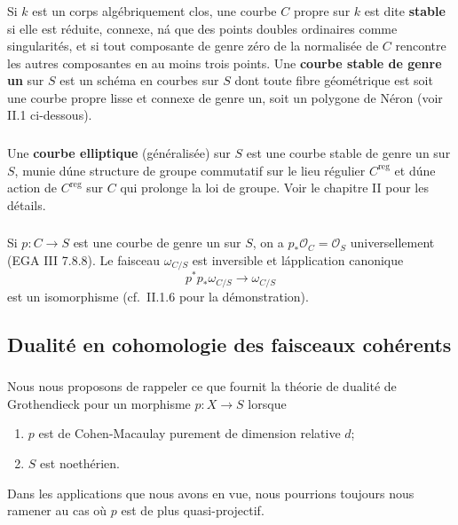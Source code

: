 \documentclass{amsart}
\theoremstyle{plain}
\theoremstyle{remark}
\newcommand{\cO}{\mathcal{O}}
\begin{document}
\subsubsection{}
Si $k$ est un corps alg\'ebriquement clos, une courbe $C$ propre sur $k$ est dite
\textbf{stable} si elle est r\'eduite, connexe, n\'a que des points doubles ordinaires comme
singularit\'es, et si tout composante de genre z\'ero de la normalis\'ee de $C$ rencontre les
autres composantes en au moins trois points. Une \textbf{courbe stable de genre un} sur $S$
est un sch\'ema en courbes sur $S$ dont toute fibre g\'eom\'etrique est soit une courbe propre
lisse et connexe de genre un, soit un polygone de N\'eron (voir II.1 ci-dessous).

\subsubsection{}
Une \textbf{courbe elliptique} (g\'en\'eralis\'ee) sur $S$ est une courbe stable de genre un sur $S$,
munie d\'une structure de groupe commutatif sur le lieu r\'egulier $C^{\mathrm{reg}}$ et d\'une action
de $C^{\mathrm{reg}}$ sur $C$ qui prolonge la loi de groupe. Voir le chapitre II pour les d\'etails.

\subsubsection{}
Si $p: C \to S$ est une courbe de genre un sur $S$, on a $p_* \cO_C = \cO_S$
universellement (EGA III 7.8.8). Le faisceau $\omega_{C/S}$ est inversible et l\'application
canonique
\[
p^* p_* \omega_{C/S} \to \omega_{C/S}
\]
est un isomorphisme (cf.~II.1.6 pour la d\'emonstration).

\subsection{Dualit\'e en cohomologie des faisceaux coh\'erents}

\subsubsection{}
Nous nous proposons de rappeler ce que fournit la th\'eorie de dualit\'e de Grothendieck
pour un morphisme $p: X \to S$ lorsque
\begin{enumerate}
\item[(a)] $p$ est de Cohen-Macaulay purement de dimension relative $d$;
\item[(b)] $S$ est noeth\'erien.
\end{enumerate}
Dans les applications que nous avons en vue, nous pourrions toujours nous ramener au cas
o\`u $p$ est de plus quasi-projectif.
\end{document}

